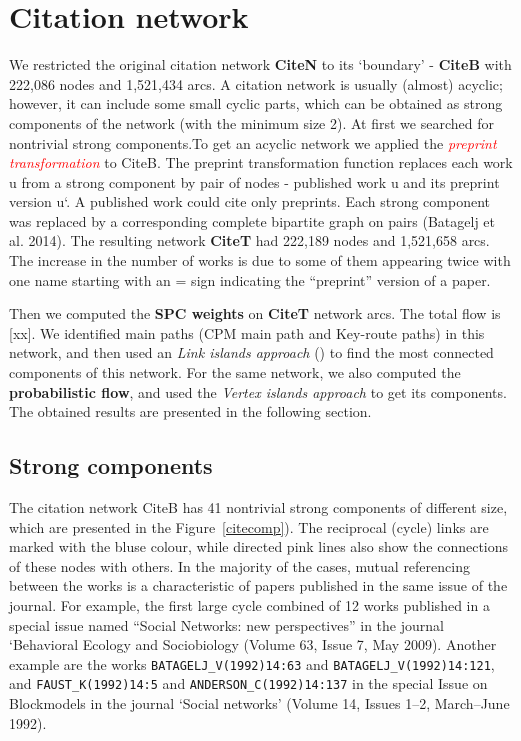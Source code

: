 \documentclass[11pt]{article} %
\newcommand{\keyw}[1]{\textcolor{red}{\emph{#1}}}
\begin{document}
\section{Citation network}  

We restricted the original citation network \textbf{CiteN} to its `boundary' - \textbf{CiteB} with 222,086 nodes and 1,521,434 arcs. A citation network is usually (almost) acyclic; however, it can include some small cyclic parts, which can be obtained as strong components of the network (with the minimum size 2). At first we searched for nontrivial strong components.To get an acyclic network we applied the \keyw{preprint transformation} to CiteB. The preprint transformation function replaces each work u from a strong component by pair of nodes - published work u and its preprint version u`. A published work could cite only preprints. Each strong component was replaced by a corresponding complete bipartite graph on pairs (Batagelj et al. 2014). The resulting network \textbf{CiteT} had 222,189 nodes and 1,521,658 arcs. The increase in the number of works is due to some of them appearing twice with one name starting with an = sign indicating the “preprint” version of a paper.\medskip

Then we computed the \textbf{SPC weights} on \textbf{CiteT} network arcs. The total flow is [xx]. We identified main paths (CPM main path and Key-route paths) in this network, and then used an \textit{Link islands approach} () to find the most connected components of this network. For the same network, we also computed the \textbf{probabilistic flow}, and used the \textit{Vertex islands approach} to get its components. The obtained results are presented in the following section. \medskip

\subsection{Strong components}  

The citation network CiteB has 41 nontrivial strong components of different size, which are presented in the  Figure~\ref{citecomp}). The reciprocal (cycle) links are marked with the bluse colour, while directed pink lines also show the connections of these nodes with others. In the majority of the cases, mutual referencing between the works is a characteristic of papers published in the same issue of the journal. For example, the first large cycle combined of 12 works published in a special issue named “Social Networks: new perspectives” in the journal `Behavioral Ecology and Sociobiology (Volume 63, Issue 7, May 2009). Another example are the works \texttt {BATAGELJ\_V(1992)14:63} and \texttt {BATAGELJ\_V(1992)14:121}, and \texttt {FAUST\_K(1992)14:5} and \texttt {ANDERSON\_C(1992)14:137} in the special Issue on Blockmodels in the journal `Social networks' (Volume 14, Issues 1–2, March–June 1992). \medskip
\end{document}
